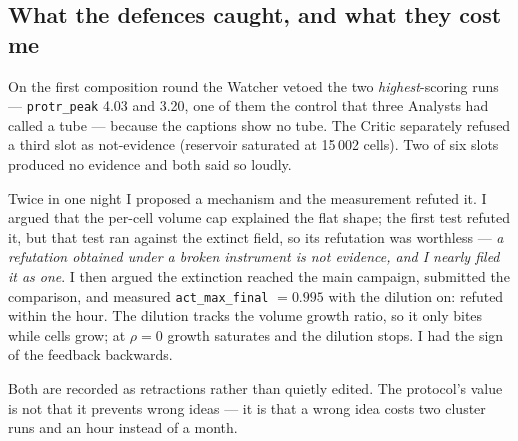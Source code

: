 \documentclass[11pt]{article}
\begin{document}
\subsection{What the defences caught, and what they cost me}

On the first composition round the Watcher vetoed the two \emph{highest}-scoring runs ---
\texttt{protr\_peak} 4.03 and 3.20, one of them the control that three Analysts had called a tube
--- because the captions show no tube. The Critic separately refused a third slot as not-evidence
(reservoir saturated at 15\,002 cells). Two of six slots produced no evidence and both said so
loudly.

Twice in one night I proposed a mechanism and the measurement refuted it. I argued that the
per-cell volume cap explained the flat shape; the first test refuted it, but that test ran against
the extinct field, so its refutation was worthless --- \emph{a refutation obtained under a broken
instrument is not evidence, and I nearly filed it as one}. I then argued the extinction reached the
main campaign, submitted the comparison, and measured \texttt{act\_max\_final} $=0.995$ with the
dilution on: refuted within the hour. The dilution tracks the volume growth ratio, so it only bites
while cells grow; at $\rho=0$ growth saturates and the dilution stops. I had the sign of the
feedback backwards.

Both are recorded as retractions rather than quietly edited. The protocol's value is not that it
prevents wrong ideas --- it is that a wrong idea costs two cluster runs and an hour instead of a
month.
\end{document}
